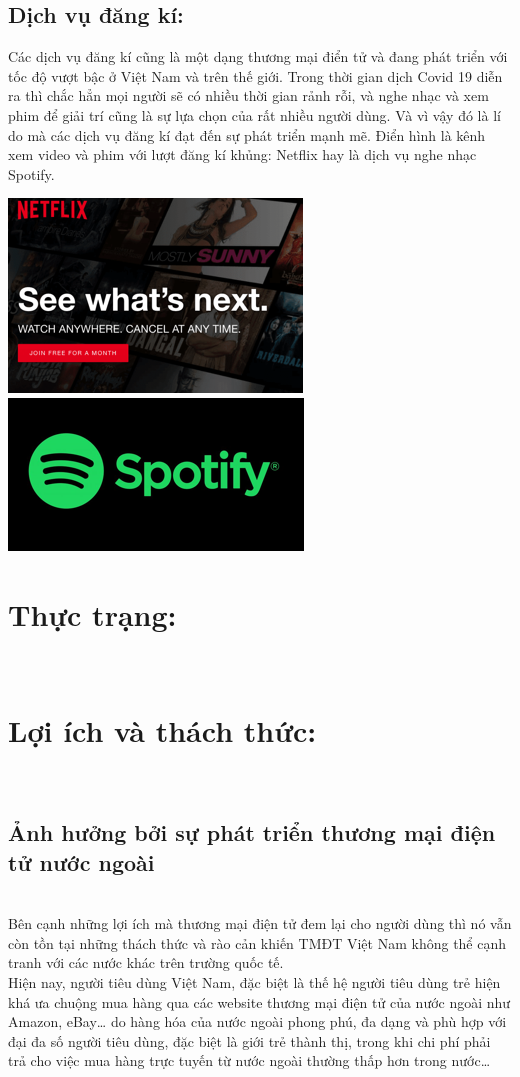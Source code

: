 \documentclass[13pt,a4paper]{article}
\begin{document}
    \subsection{Dịch vụ đăng kí:}
    Các dịch vụ đăng kí cũng là một dạng thương mại điển tử và đang phát triển với tốc độ vượt bậc ở Việt Nam và trên thế giới. Trong thời gian dịch Covid 19 diễn ra thì chắc hẳn mọi người sẽ có nhiều thời gian rảnh rỗi, và nghe nhạc và xem phim để giải trí cũng là sự lựa chọn của rất nhiều người dùng. Và vì vậy đó là lí do mà các dịch vụ đăng kí đạt đến sự phát triển mạnh mẽ. Điển hình là kênh xem video và phim với lượt đăng kí khủng: Netflix hay là dịch vụ nghe nhạc Spotify.
    \begin{center}
    \includegraphics[scale=0.85]{images/net.png} 
    \fontsize{10pt}{1.2pt}\selectfont \quad \includegraphics[scale=1.1]{images/spot.png} \\
    \fontsize{10pt}{1.2pt}\selectfont
    \end{center}
\section{Thực trạng:}\\ 
\section{Lợi ích và thách thức:}\\
    \subsection{Ảnh hưởng bởi sự phát triển thương mại điện tử nước ngoài}\\
    Bên cạnh những lợi ích mà thương mại điện tử đem lại cho người dùng thì nó vẫn còn tồn tại những thách thức và rào cản khiến TMĐT Việt Nam không thể cạnh tranh với các nước khác trên trường quốc tế.\\ 
    Hiện nay, người tiêu dùng Việt Nam, đặc biệt là thế hệ người tiêu dùng trẻ hiện khá ưa chuộng mua hàng qua các website thương mại điện tử của nước ngoài như Amazon, eBay… do hàng hóa của nước ngoài phong phú, đa dạng và phù hợp với đại đa số người tiêu dùng, đặc biệt là giới trẻ thành thị, trong khi chi phí phải trả cho việc mua hàng trực tuyến từ nước ngoài thường thấp hơn trong nước…
\end{document}
